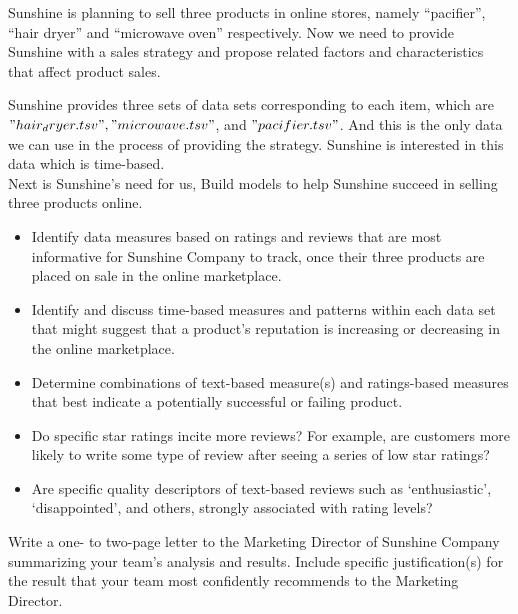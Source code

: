 \documentclass[13pt]{ctexart}
\begin{document}
Sunshine is planning to sell three products in online stores, namely “pacifier”, “hair dryer” and “microwave oven” respectively. Now we need to provide Sunshine with a sales strategy and propose related factors and characteristics that affect product sales.

 Sunshine provides three sets of data sets corresponding to each item, which are $"hair_dryer.tsv", "microwave.tsv"$, and $"pacifier.tsv"$. And this is the only data we can use in the process of providing the strategy. Sunshine is interested in this data which is time-based.\\

Next is Sunshine's need for us,
Build models to help Sunshine succeed in selling three products online.
\begin{itemize}

	\item Identify data measures based on ratings and reviews that are most informative for Sunshine Company to track, once their three products are placed on sale in the online marketplace.
	\item Identify and discuss time-based measures and patterns within each data set that might suggest that a product’s reputation is increasing or decreasing in the online marketplace.
	\item Determine combinations of text-based measure(s) and ratings-based measures that best indicate a potentially successful or failing product.
   \item  Do specific star ratings incite more reviews? For example, are customers more likely to write some type of review after seeing a series of low star ratings?
	\item Are specific quality descriptors of text-based reviews such as ‘enthusiastic’, ‘disappointed’, and others, strongly associated with rating levels?
\end{itemize}

Write a one- to two-page letter to the Marketing Director of Sunshine Company summarizing your team’s analysis and results. Include specific justification(s) for the result that your team most confidently recommends to the Marketing Director.
\end{document}
